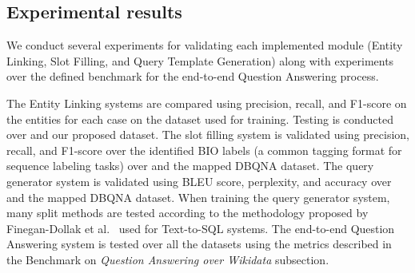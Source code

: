 \subsection*{Experimental results}
\label{cap1:intro/contributions/expResults}
We conduct several experiments for validating each implemented module (Entity Linking, 
Slot Filling, and Query Template Generation) along with experiments over the defined 
benchmark for the end-to-end Question Answering process.

The Entity Linking systems are compared using precision, recall, and F1-score on the 
entities for each case on the dataset used for training. Testing is conducted over \QALDseven{} and 
our proposed dataset. The slot filling system is validated using precision, recall, and F1-score 
over the identified BIO labels (a common tagging format for sequence labeling tasks) over 
\LCQuADtwo{} and the mapped DBQNA dataset. The query generator system is validated 
using BLEU score, perplexity, and accuracy over \LCQuADtwo{} and the mapped DBQNA 
dataset. When training the query generator system, many split methods are tested according 
to the methodology proposed by Finegan-Dollak et al.~\cite{semPar:txt-to-sql-RadevKZZFRS18} used for Text-to-SQL systems. 
The end-to-end Question Answering system is tested over all the datasets using the metrics 
described in the Benchmark on \textit{Question Answering over Wikidata} subsection.